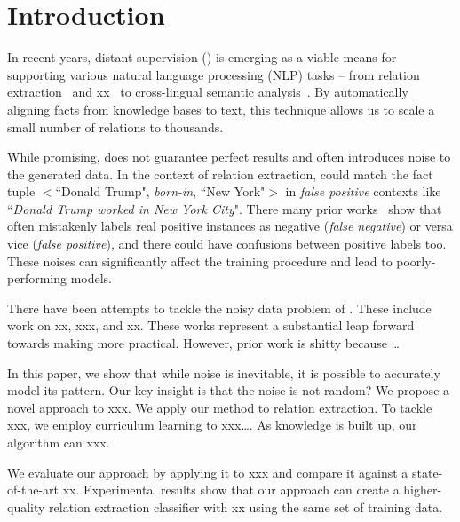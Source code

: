 \section{Introduction}

In recent years, distant supervision (\DS) is emerging as a viable means for supporting various natural language
processing (NLP) tasks -- from relation extraction~\cite{mintz2009distant} and xx~\cite{} to cross-lingual semantic
analysis~\cite{fang2016learning}. By automatically aligning
facts from knowledge bases to text, this technique allows us to scale a small number of relations to thousands.



While promising, \DS does not guarantee perfect results and often introduces noise to the
generated data. In the context of relation extraction, \DS could match the fact tuple $<$``Donald Trump",
\emph{born-in}, ``New York"$>$  in \emph{false positive} contexts like ``\emph{Donald Trump worked in New York City}".
There many prior works~\cite{} show that \DS often mistakenly labels real positive instances as negative (\emph{false negative}) or
versa vice (\emph{false positive}), and there could have confusions between positive labels too. These noises can
significantly affect the training
procedure and lead to poorly-performing models.

There have been attempts to tackle the noisy data problem of \DS. These
include work on xx, xxx, and xx. These works represent a substantial leap
forward towards making \DS more practical. However, prior work is shitty
because …

In this paper, we show that while noise is inevitable, it is possible to
accurately model its pattern. Our key insight is that the noise is not
random? We propose a novel approach to xxx. We apply our method to relation
extraction. To tackle xxx, we employ curriculum learning to xxx…. As
knowledge is built up, our algorithm can xxx.

We evaluate our approach by applying it to xxx and compare it against a
state-of-the-art xx. Experimental results show that our approach can create a
higher-quality relation extraction classifier with xx%
using the same set of training data.
